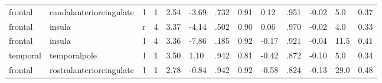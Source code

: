 \documentclass{article}
\begin{document}
\begin{longtable}{llrR{1.5cm}R{1cm}R{1.3cm}R{1cm}R{1cm}R{1.3cm}R{1cm}R{1.8cm}R{1.3cm}R{1.8cm}}
   frontal &   caudalanteriorcingulate &    l &            1 &                  2.54 &            -3.69 &               .732 &                               0.91 &                          0.12 &                            .951 & -0.02 &    5.0 &      0.37 \\
   frontal &                    insula &    r &            4 &                  3.37 &            -4.14 &               .502 &                               0.90 &                          0.06 &                            .970 & -0.02 &    4.0 &      0.33 \\
   frontal &                    insula &    l &            4 &                  3.36 &            -7.86 &               .185 &                               0.92 &                         -0.17 &                            .921 & -0.04 &   11.5 &      0.41 \\
  temporal &              temporalpole &    l &            1 &                  3.50 &             1.10 &               .942 &                               0.81 &                         -0.42 &                            .872 & -0.10 &    5.0 &      0.34 \\
   frontal &  rostralanteriorcingulate &    l &            1 &                  2.78 &            -0.84 &               .942 &                               0.92 &                         -0.58 &                            .824 & -0.13 &   29.0 &      0.48 \\
\end{longtable}
\end{document}
